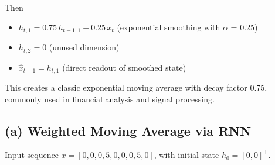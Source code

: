 \documentclass[
]{article}
\providecommand{\tightlist}{%
  \setlength{\itemsep}{0pt}\setlength{\parskip}{0pt}}
\begin{document}
Then

\begin{itemize}
\tightlist
\item
  \(h_{t,1} = 0.75\,h_{t-1,1} + 0.25\,x_t\) (exponential smoothing with
  \(\alpha\) = 0.25)
\item
  \(h_{t,2} = 0\) (unused dimension)
\item
  \(\hat{x}_{t+1} = h_{t,1}\) (direct readout of smoothed state)
\end{itemize}

This creates a classic exponential moving average with decay factor
0.75, commonly used in financial analysis and signal processing.

\subsection{(a) Weighted Moving Average via
RNN}\label{a-weighted-moving-average-via-rnn}

Input sequence \(x = [0,0,0,5,0,0,0,5,0]\), with initial state
\(h_0=[0,0]^\top\).
\end{document}
